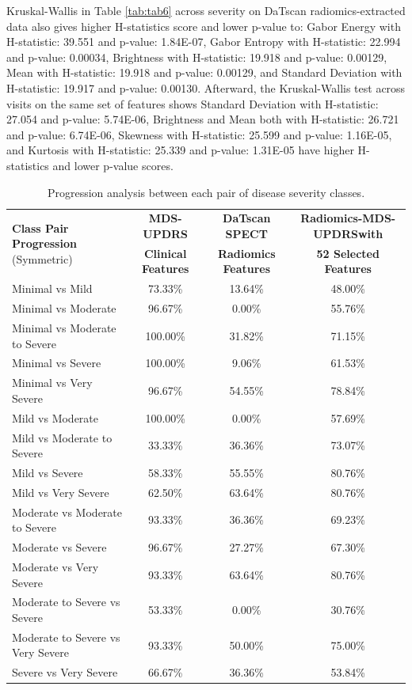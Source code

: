 \documentclass[twocolumn]{article}
\begin{document}
Kruskal-Wallis in Table \ref{tab:tab6} across severity on DaTscan radiomics-extracted data also gives higher H-statistics score and lower p-value to: Gabor Energy with H-statistic: 39.551 and p-value: 1.84E-07, Gabor Entropy with H-statistic: 22.994 and p-value: 0.00034, Brightness with H-statistic: 19.918 and p-value: 0.00129, Mean with H-statistic: 19.918 and p-value: 0.00129, and Standard Deviation with H-statistic: 19.917 and p-value: 0.00130. Afterward, the Kruskal-Wallis test across visits on the same set of features shows Standard Deviation with H-statistic: 27.054 and p-value: 5.74E-06, Brightness and Mean both with H-statistic: 26.721 and p-value: 6.74E-06, Skewness with H-statistic: 25.599 and p-value: 1.16E-05, and Kurtosis with H-statistic: 25.339 and p-value: 1.31E-05 have higher H-statistics and lower p-value scores.
\begin{table}[ht!]
    \centering
    \caption{Progression analysis between each pair of disease severity classes.}
    \label{tab:tab8}
    \renewcommand{\arraystretch}{1.5}
    \begin{tabular}{lccc}
        \hline
        \multirow{2}{*}{\textbf{Class Pair Progression} \scriptsize{(Symmetric)}} & \multicolumn{1}{c}{\textbf{MDS-UPDRS}} & \multicolumn{1}{c}{\textbf{DaTscan SPECT}} & \multicolumn{1}{c}{\textbf{Radiomics-MDS-UPDRSwith}} \\ 
        & \multicolumn{1}{c}{\textbf{Clinical Features}} & \multicolumn{1}{c}{\textbf{Radiomics Features}} & \multicolumn{1}{c}{\textbf{52 Selected Features}} \\ \hline
        Minimal vs Mild & 73.33\% & 13.64\% & 48.00\% \\ 
        Minimal vs Moderate & 96.67\% & 0.00\% & 55.76\% \\ 
        Minimal vs Moderate to Severe & 100.00\% & 31.82\% & 71.15\% \\ 
        Minimal vs Severe & 100.00\% & 9.06\% & 61.53\% \\ 
        Minimal vs Very Severe & 96.67\% & 54.55\% & 78.84\% \\ 
        Mild vs Moderate & 100.00\% & 0.00\% & 57.69\% \\ 
        Mild vs Moderate to Severe & 33.33\% & 36.36\% & 73.07\% \\ 
        Mild vs Severe & 58.33\% & 55.55\% & 80.76\% \\ 
        Mild vs Very Severe & 62.50\% & 63.64\% & 80.76\% \\ 
        Moderate vs Moderate to Severe & 93.33\% & 36.36\% & 69.23\% \\ 
        Moderate vs Severe & 96.67\% & 27.27\% & 67.30\% \\ 
        Moderate vs Very Severe & 93.33\% & 63.64\% & 80.76\% \\ 
        Moderate to Severe vs Severe & 53.33\% & 0.00\% & 30.76\% \\ 
        Moderate to Severe vs Very Severe & 93.33\% & 50.00\% & 75.00\% \\ 
        Severe vs Very Severe & 66.67\% & 36.36\% & 53.84\% \\ \hline
    \end{tabular}
\end{table}
\end{document}
